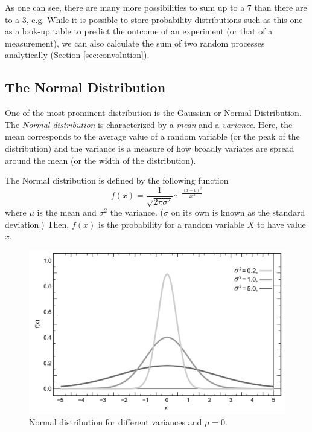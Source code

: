 As one can see, there are many more possibilities to sum up to a 7 than there are to a 3, e.g. While it is possible to store probability distributions such as this one as a look-up table to predict the outcome of an experiment (or that of a measurement), we can also calculate the sum of two random processes analytically (Section \ref{sec:convolution}). 


\subsection{The Normal Distribution}
One of the most prominent distribution is the Gaussian or Normal Distribution. The \emph{Normal distribution} is characterized by a \emph{mean} and a \emph{variance}. Here, the mean corresponds to the average value of a random variable (or the peak of the distribution) and the variance is a measure of how broadly variates are spread around the mean (or the width of the distribution).

 The Normal distribution is defined by the following function
 \begin{equation}
f(x)=\frac{1}{\sqrt{2\pi\sigma^2}}e^{-\frac{(x-\mu)^2}{2\sigma^2}}
\end{equation}
where $ \mu$ is the mean and $ \sigma^2$ the variance. ($ \sigma$ on its own is known as the standard deviation.) Then, $ f(x)$ is the probability for a random variable $ X$ to have value $ x$.

\begin{figure}
	\centering
		\includegraphics[width=\textwidth]{figs/Normal_Distribution_PDF}
	\caption{Normal distribution for different variances and $\mu=0$.}
	\label{fig:Normal_Distribution_PDF}
\end{figure}

